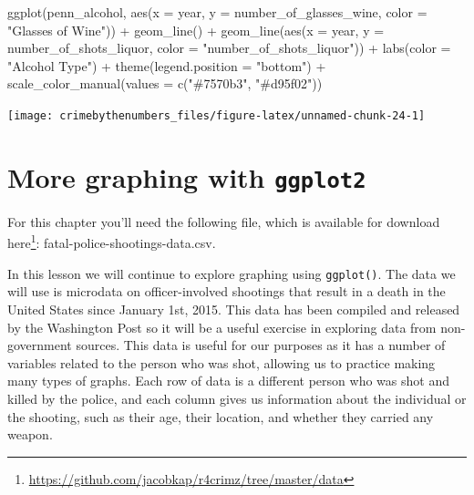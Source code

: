 \documentclass[
]{krantz}
\makeatletter
\newenvironment{Shaded}{\begin{snugshade}}{\end{snugshade}}
\newcommand{\AttributeTok}[1]{\textcolor[rgb]{0.61,0.61,0.61}{#1}}
\newcommand{\FunctionTok}[1]{\textcolor[rgb]{0,0,0}{#1}}
\newcommand{\NormalTok}[1]{#1}
\newcommand{\SpecialCharTok}[1]{\textcolor[rgb]{0,0,0}{#1}}
\newcommand{\StringTok}[1]{\textcolor[rgb]{0.5,0.5,0.5}{#1}}
\renewcommand{\href}[2]{#2\footnote{\url{#1}}}
\newenvironment{kframe}{%
\medskip{}
\setlength{\fboxsep}{.8em}
 \def\at@end@of@kframe{}%
 \ifinner\ifhmode%
  \def\at@end@of@kframe{\end{minipage}}%
  \begin{minipage}{\columnwidth}%
 \fi\fi%
 \def\FrameCommand##1{\hskip\@totalleftmargin \hskip-\fboxsep
 \colorbox{shadecolor}{##1}\hskip-\fboxsep
     \hskip-\linewidth \hskip-\@totalleftmargin \hskip\columnwidth}%
 \MakeFramed {\advance\hsize-\width
   \@totalleftmargin\z@ \linewidth\hsize
   \@setminipage}}%
 {\par\unskip\endMakeFramed%
 \at@end@of@kframe}
\renewenvironment{Shaded}{\begin{kframe}}{\end{kframe}}
\makeatother
\begin{document}
\begin{Shaded}
\begin{Highlighting}[]
\FunctionTok{ggplot}\NormalTok{(penn\_alcohol, }\FunctionTok{aes}\NormalTok{(}\AttributeTok{x =}\NormalTok{ year, }\AttributeTok{y =}\NormalTok{ number\_of\_glasses\_wine,}
                         \AttributeTok{color =} \StringTok{"Glasses of Wine"}\NormalTok{)) }\SpecialCharTok{+}
  \FunctionTok{geom\_line}\NormalTok{() }\SpecialCharTok{+}
  \FunctionTok{geom\_line}\NormalTok{(}\FunctionTok{aes}\NormalTok{(}\AttributeTok{x =}\NormalTok{ year, }\AttributeTok{y =}\NormalTok{ number\_of\_shots\_liquor,}
                \AttributeTok{color =} \StringTok{"number\_of\_shots\_liquor"}\NormalTok{)) }\SpecialCharTok{+}
  \FunctionTok{labs}\NormalTok{(}\AttributeTok{color =} \StringTok{"Alcohol Type"}\NormalTok{) }\SpecialCharTok{+}
  \FunctionTok{theme}\NormalTok{(}\AttributeTok{legend.position =} \StringTok{"bottom"}\NormalTok{) }\SpecialCharTok{+}
  \FunctionTok{scale\_color\_manual}\NormalTok{(}\AttributeTok{values =} \FunctionTok{c}\NormalTok{(}\StringTok{"\#7570b3"}\NormalTok{, }\StringTok{"\#d95f02"}\NormalTok{))}
\end{Highlighting}
\end{Shaded}

\begin{center}\texttt{[image: crimebythenumbers\_files/figure-latex/unnamed-chunk-24-1]} \end{center}

\hypertarget{ois_graphs}{%
\chapter{\texorpdfstring{More graphing with \texttt{ggplot2}}{More graphing with ggplot2}}\label{ois_graphs}}

For this chapter you'll need the following file, which is available for download \href{https://github.com/jacobkap/r4crimz/tree/master/data}{here}: fatal-police-shootings-data.csv.

In this lesson we will continue to explore graphing using \texttt{ggplot()}. The data we will use is microdata on officer-involved shootings that result in a death in the United States since January 1st, 2015. This data has been compiled and released by the Washington Post so it will be a useful exercise in exploring data from non-government sources. This data is useful for our purposes as it has a number of variables related to the person who was shot, allowing us to practice making many types of graphs. Each row of data is a different person who was shot and killed by the police, and each column gives us information about the individual or the shooting, such as their age, their location, and whether they carried any weapon.
\end{document}
